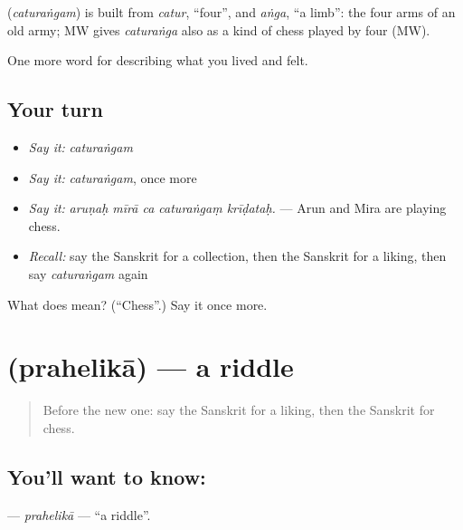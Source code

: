 \begin{cousinweb}
\textbf{} (\emph{caturaṅgam}) is built from \emph{catur}, \textquotedblleft{}four\textquotedblright{}, and \emph{aṅga}, \textquotedblleft{}a limb\textquotedblright{}: the four arms of an old army; MW gives \emph{caturaṅga} also as a kind of chess played by four (MW).
\end{cousinweb}

\begin{grammarlens}[title={What you've built}]
One more word for describing what you lived and felt.
\end{grammarlens}

\subsection*{Your turn}
\begin{itemize}
\raggedright
  \item \emph{Say it:} \emph{caturaṅgam}
  \item \emph{Say it:} \emph{caturaṅgam}, once more
  \item \emph{Say it:} \emph{aruṇaḥ mīrā ca caturaṅgaṃ krīḍataḥ.} — Arun and Mira are playing chess.
  \item \emph{Recall:} say the Sanskrit for a collection, then the Sanskrit for a liking, then say \emph{caturaṅgam} again
\end{itemize}

\begin{tcolorbox}[breakable,colback=teal!4,colframe=teal!35!black,title={Before you move on}]
What does  mean? (\textquotedblleft{}Chess\textquotedblright{}.) Say it once more.
\end{tcolorbox}
\section[\texorpdfstring{\sk{प्रहेलिका} (prahelikā)}{प्रहेलिका (prahelikā)}]{ (prahelikā) — a riddle}

\label{lesson:SA-C517-prahelika}



\begin{quote}
Before the new one: say the Sanskrit for a liking, then the Sanskrit for chess.
\end{quote}

\subsection*{You'll want to know: }
\textbf{} — \emph{prahelikā} — \textquotedblleft{}a riddle\textquotedblright{}.

